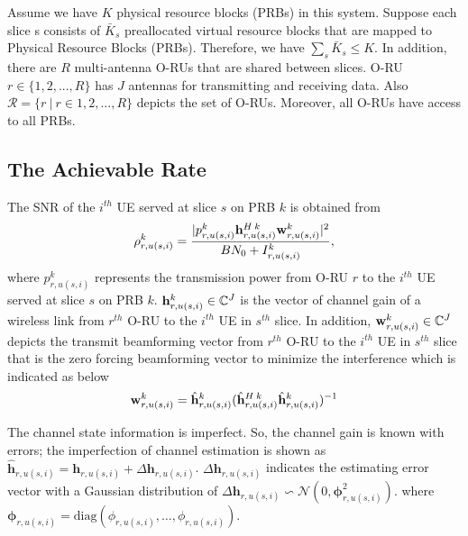 \documentclass[lettersize,journal]{IEEEtran}
\begin{document}
\textcolor{Sepia}{ Assume we have $K$ physical resource blocks (PRBs) in this system. Suppose each slice s consists of $\bar{K}_s$ preallocated virtual resource blocks that are mapped to Physical Resource Blocks (PRBs). Therefore, we have $\sum_s \bar{K}_s \leq K$.
}
In addition, there are $R$ multi-antenna O-RUs that are shared between slices. O-RU $r \in \{1,2,...,R \}$ has $J$ antennas for transmitting and receiving data. Also $\mathcal{R} = \{ r \ | \ r\in 1,2,...,R \}$ depicts the set of O-RUs. Moreover, all O-RUs have access to all PRBs.

\subsection{The Achievable Rate}
The SNR of the $i^{th}$ UE served at slice $s$ on PRB $k$ is obtained from
\begin{equation}\label{eq1}
\rho_{r,u(s,i)}^{k} =  \frac{|p_{r,u(s,i)}^{k}{\bold{h}_{r,u(s,i)}^{H \: k}} \bold{w}_{r,u(s,i)}^{k}|^2}{BN_0 + I_{r,u(s,i)}^{k}},
\end{equation} 
where $p_{r,u(s,i)}^{k}$ represents the transmission power from O-RU $r$ to the $i^{th}$ UE served at slice $s$ on PRB $k$. 
${\bold{h}_{r,u(s,i)}^{k}} \in \mathbb{C}^{J}$ is the vector of channel gain of a wireless link from 
$r^{th}$ O-RU to the $i^{th}$ UE in $s^{th}$ slice. In addition, $\bold{w}_{r,u(s,i)}^{k} \in \mathbb{C}^{J}$ depicts the  transmit beamforming vector from $r^{th}$ O-RU to the $i^{th}$ UE in $s^{th}$ slice that is the zero forcing beamforming vector to minimize the interference which is indicated as below
\begin{equation}
\bold{w}_{r,u(s,i)}^{k} = \hat{\bold{h}}_{r,u(s,i)}^{k}(\hat{\bold{h}}_{r,u(s,i)}^{H \: k} \hat{\bold{h}}_{r,u(s,i)}^{k})^{-1}
\end{equation}

The channel state information is imperfect. So, the channel gain is known with errors; the imperfection of channel estimation is shown as
$\hat{\boldsymbol{h}}_{r,u(s,i)} = \boldsymbol{h}_{r,u(s,i)} + \Delta \boldsymbol{h}_{r,u(s,i)}$.
$\Delta \boldsymbol{h}_{r,u(s,i)}$ indicates the estimating error vector with a Gaussian distribution of
$\Delta \boldsymbol{h}_{r,u(s,i)}\backsim \mathcal{N}(0,\boldsymbol{\phi}_{r,u(s,i)}^2)$.
where $\boldsymbol{\phi}_{r,u(s,i)} = \text{diag}(\phi_{r,u(s,i)},\ldots,\phi_{r,u(s,i)}).$
\end{document}
